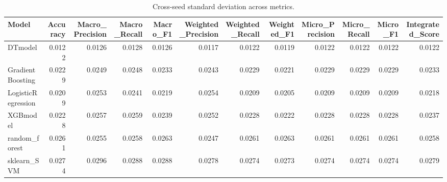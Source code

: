 \begin{table}[t]
\centering
\begin{tabular}{lrrrrrrrrrrr}
\toprule
Model & Accuracy & Macro_Precision & Macro_Recall & Macro_F1 & Weighted_Precision & Weighted_Recall & Weighted_F1 & Micro_Precision & Micro_Recall & Micro_F1 & Integrated_Score \\
\midrule
DTmodel & 0.0122 & 0.0126 & 0.0128 & 0.0126 & 0.0117 & 0.0122 & 0.0119 & 0.0122 & 0.0122 & 0.0122 & 0.0122 \\
GradientBoosting & 0.0229 & 0.0249 & 0.0248 & 0.0233 & 0.0243 & 0.0229 & 0.0221 & 0.0229 & 0.0229 & 0.0229 & 0.0233 \\
LogisticRegression & 0.0209 & 0.0253 & 0.0241 & 0.0219 & 0.0254 & 0.0209 & 0.0205 & 0.0209 & 0.0209 & 0.0209 & 0.0218 \\
XGBmodel & 0.0228 & 0.0257 & 0.0259 & 0.0239 & 0.0252 & 0.0228 & 0.0222 & 0.0228 & 0.0228 & 0.0228 & 0.0237 \\
random_forest & 0.0261 & 0.0255 & 0.0258 & 0.0263 & 0.0247 & 0.0261 & 0.0263 & 0.0261 & 0.0261 & 0.0261 & 0.0258 \\
sklearn_SVM & 0.0274 & 0.0296 & 0.0288 & 0.0288 & 0.0278 & 0.0274 & 0.0273 & 0.0274 & 0.0274 & 0.0274 & 0.0279 \\
\bottomrule
\end{tabular}
\caption{Cross-seed standard deviation across metrics.}
\label{tab:cross_seed_std}
\end{table}